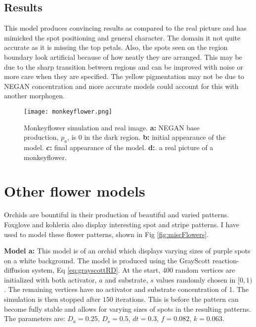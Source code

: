 \subsection*{Results}
This model produces convincing results as compared to the real picture and has mimicked the spot positioning and general character. The domain it not quite accurate as it is missing the top petals. Also, the spots seen on the region boundary look artificial because of how neatly they are arranged. This may be due to the sharp transition between regions and can be improved with noise or more care when they are specified. The yellow pigmentation may not be due to NEGAN concentration and more accurate models could account for this with another morphogen.

\begin{figure}[ht]
	\centering
	\texttt{[image: monkeyflower.png]}
	\caption{Monkeyflower simulation and real image. \textbf{a:} NEGAN base production, $p_a$, is 0 in the dark region. \textbf{b:} initial appearance of the model. \textbf{c:} final appearance of the model. \textbf{d:}. a real picture of a monkeyflower.}
	\label{fig:monkeyflower}
\end{figure}

\section{Other flower models}
Orchids are bountiful in their production of beautiful and varied patterns. Foxglove and kohleria also display interesting spot and stripe patterns. I have used \ProgramName{} to model these flower patterns, shown in Fig \ref{fig:miscFlowers}.

\textbf{Model a:} 
This model is of an orchid which displays varying sizes of purple spots on a white background. The model is produced using the GrayScott reaction-diffusion system, Eq \ref{eq:grayscottRD}. At the start, 400 random vertices are initialized with both activator, $a$ and substrate, $s$ values randomly chosen in $[0, 1)$. The remaining vertices have no activator and substrate concentration of 1. The simulation is then stopped after $150$ iterations. This is before the pattern can become fully stable and allows for varying sizes of spots in the resulting patterns. The parameters are: $D_a = 0.25$, $D_s = 0.5$, $dt = 0.3$, $f = 0.082$, $k = 0.063$.

